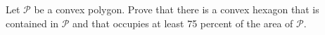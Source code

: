 Let $\mathcal{P}$ be a convex polygon. Prove that there is a convex hexagon that is contained in $\mathcal{P}$ and that occupies at least 75 percent of the area of $\mathcal{P}$.
